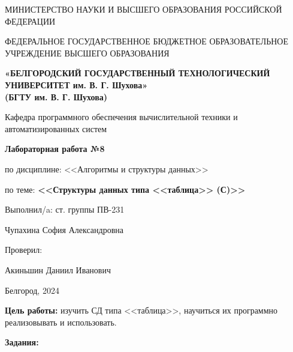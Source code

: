 \documentclass[12pt]{article}
\begin{document}
	\begin{center}
		{\parskip=1cm
			МИНИСТЕРСТВО НАУКИ И ВЫСШЕГО ОБРАЗОВАНИЯ РОССИЙСКОЙ ФЕДЕРАЦИИ
			
			ФЕДЕРАЛЬНОЕ ГОСУДАРСТВЕННОЕ БЮДЖЕТНОЕ ОБРАЗОВАТЕЛЬНОЕ УЧРЕЖДЕНИЕ ВЫСШЕГО ОБРАЗОВАНИЯ
			
			{\bf«БЕЛГОРОДСКИЙ ГОСУДАРСТВЕННЫЙ ТЕХНОЛОГИЧЕСКИЙ УНИВЕРСИТЕТ им. В. Г. Шухова»\\(БГТУ им. В. Г. Шухова)}
			
			
			\begin{figure}[bh]
			\noindent{}
			\end{figure}
			Кафедра программного обеспечения вычислительной техники и автоматизированных систем
		}
		{\parskip=0.25cm
			{\Large 
				{\bf Лабораторная работа №8}
			
				по дисциплине: <<Алгоритмы и структуры данных>>
			
				по теме: {\bf <<Структуры данных типа <<таблица>> (С)>>}
			}
		}
	\end{center}
	\begin{flushright}
		{\parskip=3cm Выполнил/a: ст. группы ПВ-231}
		
		Чупахина София Александровна
		
		Проверил:
		
		Акиньшин Даниил Иванович
	\end{flushright}
	\begin{center}
		{\parskip=3cm Белгород, 2024}
	\end{center}
	\newpage
	
	{\bf Цель работы:} изучить СД типа <<таблица>>, научиться их программно реализовывать и использовать.
	
	{\bf Задания:}
	
	
\end{document}
